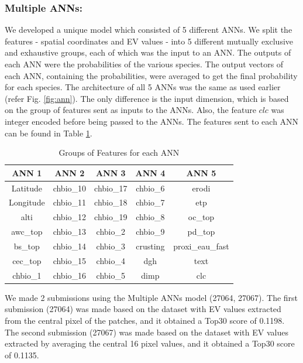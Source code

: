 \documentclass[runningheads]{llncs}
\begin{document}
\subsubsection{Multiple ANNs:}
We developed a unique model which consisted of 5 different ANNs. We split the features - spatial coordinates and EV values - into 5 different mutually exclusive and exhaustive groups, each of which was the input to an ANN. The outputs of each ANN were the probabilities of the various species. The output vectors of each ANN, containing the probabilities, were averaged to get the final probability for each species. The architecture of all 5 ANNs was the same as used earlier (refer Fig. \ref{fig:ann}). The only difference is the input dimension, which is based on the group of features sent as inputs to the ANNs. Also, the feature $clc$ was integer encoded before being passed to the ANNs. The features sent to each ANN can be found in Table \ref{table:manns}.
\begin{table}[]
\centering
\setlength{\abovecaptionskip}{20pt}
\setlength{\belowcaptionskip}{-7pt}
\begin{tabular}{|c|c|c|c|c|}
\hline
\textbf{ANN 1} & \textbf{ANN 2} & \textbf{ANN 3} & \textbf{ANN 4} & \textbf{ANN 5} \\ \hline
Latitude & chbio\_10 & chbio\_17 & chbio\_6 & erodi \\
Longitude & chbio\_11 & chbio\_18 & chbio\_7 & etp \\
alti & chbio\_12 & chbio\_19 & chbio\_8 & oc\_top \\
awc\_top & chbio\_13 & chbio\_2 & chbio\_9 & pd\_top \\
bs\_top & chbio\_14 & chbio\_3 & crusting & proxi\_eau\_fast \\
cec\_top & chbio\_15 & chbio\_4 & dgh & text \\
chbio\_1 & chbio\_16 & chbio\_5 & dimp & clc \\ \hline
\end{tabular}
\caption{Groups of Features for each ANN}
\label{table:manns}
\end{table}
\newline
\noindent We made 2 submissions using the Multiple ANNs model (27064, 27067). The first submission (27064) was made based on the dataset with EV values extracted from the central pixel of the patches, and it obtained a Top30 score of 0.1198. The second submission (27067) was made based on the dataset with EV values extracted by averaging the central 16 pixel values, and it obtained a Top30 score of 0.1135.
\end{document}

